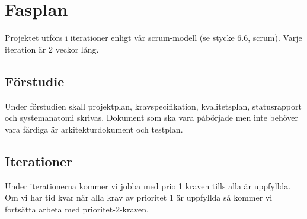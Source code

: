 \section{Fasplan}
Projektet utförs i iterationer enligt vår scrum-modell (se stycke 6.6, scrum). Varje iteration är 2 veckor lång.

\subsection{Förstudie}
Under förstudien skall projektplan, kravspecifikation, kvalitetsplan, statusrapport och systemanatomi skrivas. Dokument som ska vara påbörjade men inte behöver vara färdiga är arkitekturdokument och testplan.

\subsection{Iterationer}
Under iterationerna kommer vi jobba med prio 1 kraven tills alla är uppfyllda. Om vi har tid kvar när alla krav av prioritet 1 är uppfyllda så kommer vi fortsätta arbeta med prioritet-2-kraven.


